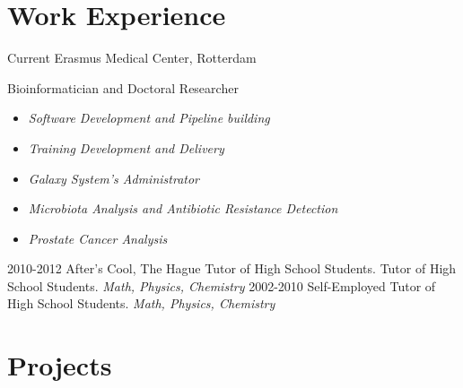 \documentclass[]{shiltemann-cv}
\begin{document}
\section{Work Experience}

\begin{entrylist}
 \entry
    {Current}
    {Erasmus Medical Center, Rotterdam}
    {}
    {Bioinformatician and Doctoral Researcher
     \begin{itemize}
     \item \emph{Software Development and Pipeline building}
     \item \emph{Training Development and Delivery}
     \item \emph{Galaxy System's Administrator}
     \item \emph{Microbiota Analysis and Antibiotic Resistance Detection}
     \item \emph{Prostate Cancer Analysis}
     \end{itemize}}
  \entry
    {2010-2012}
    {After's Cool, The Hague}
    {Tutor of High School Students.}
    {Tutor of High School Students. \emph{Math, Physics, Chemistry}}
  \entry
    {2002-2010}
    {Self-Employed}
    {}
    {Tutor of High School Students. \emph{Math, Physics, Chemistry}}
\end{entrylist}

\section{Projects}
\end{document}
